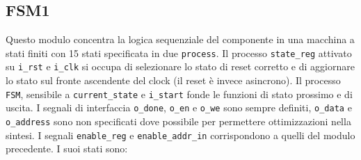 \documentclass [a4paper, 12pt]{article}
\begin{document}
\subsection{FSM1}
Questo modulo concentra la logica sequenziale del componente in una macchina a stati finiti con 15 stati specificata in due \texttt{process}. Il processo \texttt{state\_reg} attivato su \texttt{i\_rst} e \texttt{i\_clk} si occupa di selezionare lo stato di reset corretto e di aggiornare lo stato sul fronte ascendente del clock (il reset \`e invece asincrono). Il processo \texttt{FSM}, sensibile a \texttt{current\_state} e \texttt{i\_start} fonde le funzioni di stato prossimo e di uscita. I segnali di interfaccia \texttt{o\_done}, \texttt{o\_en} e \texttt{o\_we} sono sempre definiti, \texttt{o\_data} e \texttt{o\_address} sono non specificati dove possibile per permettere ottimizzazioni nella sintesi. I segnali \texttt{enable\_reg} e \texttt{enable\_addr\_in} corrispondono a quelli del modulo precedente.
I suoi stati sono:
\end{document}
